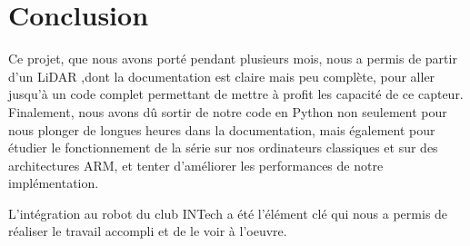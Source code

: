 \section*{Conclusion}
\tab Ce projet, que nous avons porté pendant plusieurs mois, nous a permis de partir d'un LiDAR ,dont la documentation est claire mais peu complète, pour aller jusqu'à un code complet permettant de mettre à profit les capacité de ce capteur. Finalement, nous avons dû sortir de notre code en Python non seulement pour nous plonger de longues heures dans la documentation, mais également pour étudier le fonctionnement de la série sur nos ordinateurs classiques et sur des architectures ARM, et tenter d'améliorer les performances de notre implémentation.

\tab L'intégration au robot du club INTech a été l'élément clé qui nous a permis de réaliser le travail accompli et de le voir à l'oeuvre. 

